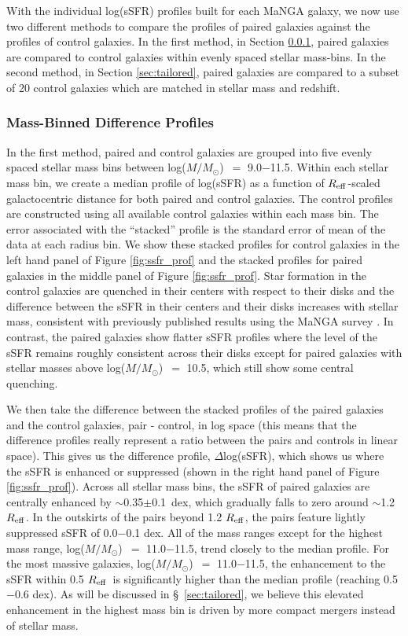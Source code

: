 \documentclass[iop,revtex4,twocolumn,apj,numberedappendix,appendixfloats]{emulateapj}
\newcommand{\reff}{$R_{\rm eff}$}
\newcommand{\logm}{log($M/M_{\odot}$)}
\begin{document}
With the individual log(sSFR) profiles built for each MaNGA galaxy, we now use two different methods to compare the profiles of paired galaxies against the profiles of control galaxies. In the first method, in Section \ref{sec:mass-bin}, paired galaxies are compared to control galaxies within evenly spaced stellar mass-bins. In the second method, in Section \ref{sec:tailored}, paired galaxies are compared to a subset of 20 control galaxies which are matched in stellar mass and redshift. 

\subsubsection{Mass-Binned Difference Profiles}\label{sec:mass-bin}

In the first method, paired and control galaxies are grouped into five evenly spaced stellar mass bins between \logm\ $=$ 9.0$-$11.5. Within each stellar mass bin, we create a median profile of log(sSFR) as a function of \reff-scaled galactocentric distance for both paired and control galaxies. The control profiles are constructed using all available control galaxies within each mass bin. The error associated with the ``stacked'' profile is the standard error of mean of the data at each radius bin. We show these stacked profiles for control galaxies in the left hand panel of Figure \ref{fig:ssfr_prof} and the stacked profiles for paired galaxies in the middle panel of Figure \ref{fig:ssfr_prof}. Star formation in the control galaxies are quenched in their centers with respect to their disks and the difference between the sSFR in their centers and their disks increases with stellar mass, consistent with previously published results using the MaNGA survey \citep{Belfiore:2018}. In contrast, the paired galaxies show flatter sSFR profiles where the level of the sSFR remains roughly consistent across their disks except for paired galaxies with stellar masses above \logm\ $=$ 10.5, which still show some central quenching. 

We then take the difference between the stacked profiles of the paired galaxies and the control galaxies, pair - control, in log space (this means that the difference profiles really represent a ratio between the pairs and controls in linear space). This gives us the difference profile, $\Delta$log(sSFR), which shows us where the sSFR is enhanced or suppressed (shown in the right hand panel of Figure \ref{fig:ssfr_prof}). Across all stellar mass bins, the sSFR of paired galaxies are centrally enhanced by $\sim$0.35$\pm$0.1~dex, which gradually falls to zero around $\sim$1.2 \reff. In the outskirts of the pairs beyond 1.2 \reff, the pairs feature lightly suppressed sSFR of 0.0$-$0.1 dex. All of the mass ranges except for the highest mass range, \logm\ $=$ 11.0$-$11.5, trend closely to the median profile. For the most massive galaxies, \logm\ $=$ 11.0$-$11.5, the enhancement to the sSFR within 0.5 \reff\ is significantly higher than the median profile (reaching 0.5$-$0.6 dex). As will be discussed in \S~\ref{sec:tailored}, we believe this elevated enhancement in the highest mass bin is driven by more compact mergers instead of stellar mass. 
\end{document}
